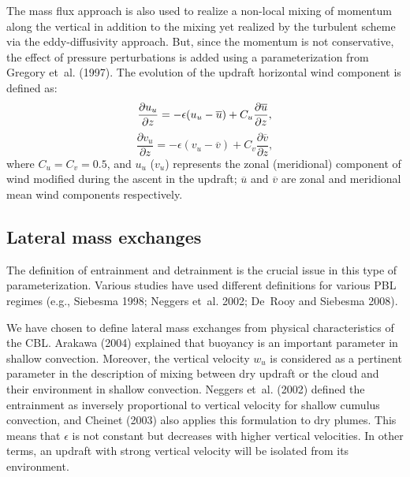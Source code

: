 The mass flux approach is also used to realize a non-local mixing of momentum along the vertical in addition to the mixing yet realized by the turbulent scheme via the eddy-diffusivity approach. But, since the momentum is not conservative, the effect of pressure perturbations is added using a parameterization from Gregory et~al. (1997). The evolution of the updraft horizontal wind component is defined as: 
\begin{equation}
    \frac{\partial{u_u}}{\partial{z}}=-\epsilon(u_u-\overline{u})+C_u\frac{\partial{\overline{u}}}{\partial{z}}\\
\label{eq:uevol},
\end{equation}
\begin{equation}
    \frac{\partial{v_u}}{\partial{z}}=-\epsilon(v_u-\overline{v})+C_v\frac{\partial{\overline{v}}}{\partial{z}}
\label{eq:uevol1},
\end{equation}
where $C_u=C_v=0.5$, and $u_u$ ($v_u$) represents the zonal (meridional) component of wind modified during the ascent in the updraft; $\overline{u}$ and $\overline{v}$ are zonal and meridional mean wind components respectively. 

\subsection{Lateral mass exchanges}

The definition of entrainment and detrainment is the crucial issue in this type of parameterization. Various studies have used different definitions for various PBL regimes (e.g., Siebesma 1998; Neggers et~al. 2002; De~Rooy and Siebesma 2008).

We have chosen to define lateral mass exchanges from physical characteristics of the CBL. Arakawa (2004) explained that buoyancy is an important parameter in shallow convection. Moreover, the vertical velocity $w_u$ is considered as a pertinent parameter in the description of mixing between dry updraft or the cloud and their environment in shallow convection. Neggers et~al. (2002) defined the entrainment as inversely proportional to vertical velocity for shallow cumulus convection, and Cheinet (2003) also applies this formulation to dry plumes. This means that $\epsilon$ is not constant but decreases with higher vertical velocities. In other terms, an updraft with strong vertical velocity will be isolated from its environment. 

